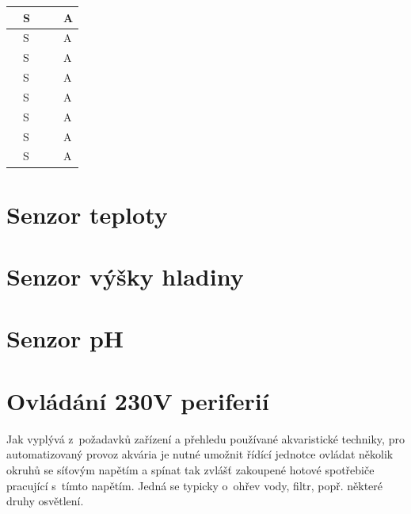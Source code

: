 \begin{table}[h]
\begin{tabular}{|l|l|l|l|l|}
                                & S &  &  & A  \\ \hline
                                & S &  &  & A  \\ \hline
                                & S &  &  & A  \\ \hline
                                & S &  &  & A  \\ \hline
                                & S &  &  & A  \\ \hline
                                & S &  &  & A  \\ \hline
                                & S &  &  & A  \\ \hline
                                & S &  &  & A  \\ \hline
            \end{tabular}
        
    \end{table}



\section{Senzor teploty}
\label{sec:perif-sensor-teploty}

\section{Senzor výšky hladiny}
\label{sec:perif-sensor-hladina}

\section{Senzor pH}
\label{sec:perif-sensor-ph}

\section{Ovládání 230V periferií}
\label{sec:perif-230v}

Jak vyplývá z~požadavků zařízení a přehledu používané akvaristické techniky, pro automatizovaný provoz akvária je nutné umožnit řídící jednotce ovládat několik okruhů se síťovým napětím a spínat tak zvlášť zakoupené hotové spotřebiče pracující s~tímto napětím. Jedná se typicky o~ohřev vody, filtr, popř. některé druhy osvětlení. 


